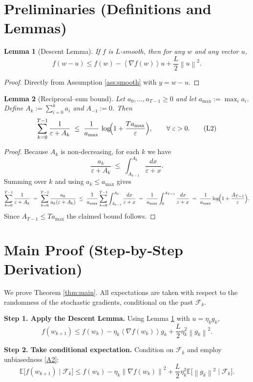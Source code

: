 \documentclass{article}
\newtheorem{lemma}{Lemma}
\newcommand{\E}{\mathbb{E}}
\newcommand{\norm}[1]{\left\lVert#1\right\rVert}
\newcommand{\inner}[1]{\left\langle#1\right\rangle}
\begin{document}
\section*{Preliminaries (Definitions and Lemmas)}
\begin{lemma}[Descent Lemma]\label{lem:descent}
If $f$ is $L$‑smooth, then for any $w$ and any vector $u$,
\[
f(w-u)\le f(w)-\inner{\nabla f(w)}{u}+\frac{L}{2}\norm{u}^{2}.
\tag{L1}
\]
\end{lemma}
\begin{proof}
Directly from Assumption \ref{ass:smooth} with $y=w-u$.
\end{proof}

\begin{lemma}[Reciprocal–sum bound]\label{lem:recip}
Let $a_0,\dots,a_{T-1}\ge 0$ and let $a_{\max}:=\max_i a_i$.  Define
$A_k:=\sum_{i=0}^{k}a_i$ and $A_{-1}:=0$.  Then
\[
\sum_{k=0}^{T-1}\frac{1}{\varepsilon+A_k}
\;\le\;
\frac{1}{a_{\max}}\,
\log\!\Bigl(1+\frac{T a_{\max}}{\varepsilon}\Bigr),
\qquad\forall\;\varepsilon>0.
\tag{L2}
\]
\end{lemma}
\begin{proof}
Because $A_k$ is non‑decreasing, for each $k$ we have
\[
\frac{a_k}{\varepsilon+A_k}
\;\le\;
\int_{A_{k-1}}^{A_k}\frac{dx}{\varepsilon+x}.
\]
Summing over $k$ and using $a_k\le a_{\max}$ gives
\[
\sum_{k=0}^{T-1}\frac{1}{\varepsilon+A_k}
\;=\;
\sum_{k=0}^{T-1}\frac{a_k}{a_k(\varepsilon+A_k)}
\;\le\;
\frac{1}{a_{\max}}
\sum_{k=0}^{T-1}\int_{A_{k-1}}^{A_k}\frac{dx}{\varepsilon+x}
\;=\;
\frac{1}{a_{\max}}
\int_{0}^{A_{T-1}}\frac{dx}{\varepsilon+x}
\;=\;
\frac{1}{a_{\max}}
\log\!\Bigl(1+\frac{A_{T-1}}{\varepsilon}\Bigr).
\]
Since $A_{T-1}\le T a_{\max}$ the claimed bound follows.
\end{proof}

\section*{Main Proof (Step‑by‑Step Derivation)}
We prove Theorem \ref{thm:main}.  
All expectations are taken with respect to the randomness of the stochastic gradients, conditional on the past $\mathcal{F}_k$.

\noindent\textbf{Step 1. Apply the Descent Lemma.}  
Using Lemma \ref{lem:descent} with $u=\eta_k g_k$,
\[
f(w_{k+1})\le f(w_k)-\eta_k\inner{\nabla f(w_k)}{g_k}
+\frac{L}{2}\eta_k^{2}\norm{g_k}^{2}.
\tag{5}
\]

\noindent\textbf{Step 2. Take conditional expectation.}  
Condition on $\mathcal{F}_k$ and employ unbiasedness \eqref{A2}:
\[
\E\!\big[f(w_{k+1})\mid\mathcal{F}_k\big]
\le f(w_k)-\eta_k\norm{\nabla f(w_k)}^{2}
+\frac{L}{2}\eta_k^{2}\E\!\big[\norm{g_k}^{2}\mid\mathcal{F}_k\big].
\tag{6}
\]
\end{document}
